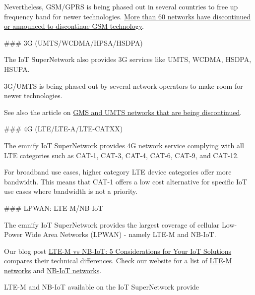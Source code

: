\documentclass[11pt, oneside]{article}   	%
\begin{document}
Nevertheless, GSM/GPRS is being phased out in several countries to free up frequency band for newer technologies. 
\href{https://www.emnify.com/en/resources/global-2g-phase-out}{More than 60 networks have discontinued or announced to discontinue GSM technology}.
\begin{markdown}

### 3G (UMTS/WCDMA/HPSA/HSDPA)

The IoT SuperNetwork also provides 3G services like UMTS, WCDMA, HSDPA, HSUPA. 

3G/UMTS is being phased out by several network operators to make room for newer technologies.  
\end{markdown}
See also the article on 
\href{https://www.emnify.com/en/resources/global-2g-phase-out}{GMS and UMTS networks that are being discontinued}.
\begin{markdown}

### 4G (LTE/LTE-A/LTE-CATXX)

The emnify IoT SuperNetwork provides 4G network service  complying with all LTE categories such as CAT-1, CAT-3, CAT-4, CAT-6, CAT-9, and CAT-12. 

For broadband use cases, higher category LTE device categories offer more bandwidth.
This means that CAT-1 offers a low cost alternative for specific IoT use cases where bandwidth is not a priority.

### LPWAN: LTE-M/NB-IoT

The emnify IoT SuperNetwork provides the largest coverage of cellular Low-Power Wide Area Networks (LPWAN) - namely LTE-M and NB-IoT.
\end{markdown}
Our blog post \href{https://www.emnify.com/blog/lte-m-nb-iot}{LTE-M vs NB-IoT: 5 Considerations for Your IoT Solutions} compares their technical differences.
Check our website for a list of \href{https://www.emnify.com/global-iot-coverage/lte-m-coverage}{LTE-M networks} and \href{https://www.emnify.com/global-iot-coverage/nb-iot-coverage}{NB-IoT networks}.

LTE-M and NB-IoT available on the IoT SuperNetwork provide 
\end{document}
